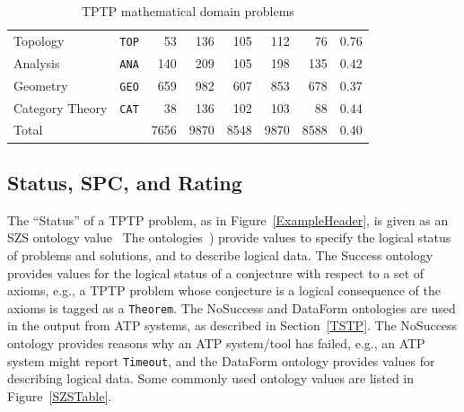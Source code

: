 \documentclass[runningheads]{llncs}
\begin{document}
\begin{table}[tb]
\begin{center}
\begin{tabular}{lr|rr|rrrr}
Topology            & {\tt TOP} &   53 &  136 &  105 &  112 &   76 & 0.76 \\
Analysis            & {\tt ANA} &  140 &  209 &  105 &  198 &  135 & 0.42 \\
Geometry            & {\tt GEO} &  659 &  982 &  607 &  853 &  678 & 0.37 \\
Category Theory     & {\tt CAT} &   38 &  136 &  102 &  103 &   88 & 0.44 \\
\hline
Total               &           & 7656 & 9870 & 8548 & 9870 & 8588 & 0.40 \\
\end{tabular}
\end{center}
\caption{TPTP mathematical domain problems}
\label{Domains}
\end{table}

\subsection{Status, SPC, and Rating}
\label{Characteristics}

The ``Status'' of a TPTP problem, as in Figure~\ref{ExampleHeader}, is given as an SZS ontology 
value~\cite{Sut08-KEAPPA}
The ontologies~\cite{SZS03}) provide values to specify the logical status of problems and
solutions, and to describe logical data.
The Success ontology provides values for the logical status of a conjecture with respect to a 
set of axioms, e.g., a TPTP problem whose conjecture is a logical consequence of the axioms 
is tagged as a {\tt Theorem}.
The NoSuccess and DataForm ontologies are used in the output from ATP systems, as described in
Section~\ref{TSTP}.
The NoSuccess ontology provides reasons why an ATP system/tool has failed, e.g., an ATP system 
might report {\tt Timeout}, and the DataForm ontology provides values for describing logical 
data.
Some commonly used ontology values are listed in Figure~\ref{SZSTable}.

\end{document}
